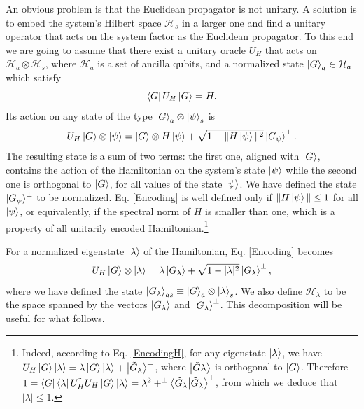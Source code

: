 \documentclass[a4paper,11pt]{article}
\begin{document}
An obvious problem is that the Euclidean propagator is not unitary. A solution is to embed the system's Hilbert space $\mathcal{H}_s$ in a larger one and find a unitary operator that acts on the system factor as the Euclidean propagator. To this end we are going to assume that there exist a unitary oracle $U_H$ that acts on $\mathcal{H}_a\otimes\mathcal{H}_s$, where $\mathcal{H}_a$ is a set of ancilla qubits, and a normalized state $\ket{G}_a\in\mathcal{H}_a$ which satisfy 
\begin{equation}
    \bra{G}U_H\ket{G}=H.
\label{EncodingH}
\end{equation}
Its action on any state of the type $\ket{G}_a\otimes \ket{\psi}_s$ is 
\begin{equation}
    U_H\ket{G}\otimes \ket{\psi}=\ket{G}\otimes H\ket{\psi}+\sqrt{1-\|H\ket{\psi}\|^2}\ket{G_\psi}^\perp.
    \label{Encoding}
\end{equation}
The resulting state is a sum of two terms: the first one, aligned with $\ket{G}$, contains the action of the Hamiltonian on the system's state $\ket{\psi}$ while the second one is orthogonal to $\ket{G}$, for all values of the state $\ket{\psi}$. We have defined the state $\ket{G_\psi}^\perp$ to be normalized. Eq. \eqref{Encoding} is well defined only if $\|H\ket{\psi}\|\leq 1$ for all $\ket{\psi}$, or equivalently, if the spectral norm of $H$ is smaller than one, which is a property of all unitarily encoded Hamiltonian.\footnote{Indeed, according to Eq. \eqref{EncodingH}, for any eigenstate $\ket{\lambda}$, we have $U_H\ket{G}\ket{\lambda} = \lambda \ket{G}\ket{\lambda} + \ket{\tilde{G}_\lambda}^\perp$, where $\ket{\tilde{G}\lambda}$ is orthogonal to $\ket{G}$. Therefore $1 = \bra{G}\bra{\lambda}U^\dagger_H U_H\ket{G}\ket{\lambda} = \lambda^2 +^\perp\braket{\tilde{G}_\lambda}^\perp$, from which we deduce that $|\lambda|\leq 1.$}

For a normalized eigenstate $\ket{\lambda}$ of the Hamiltonian, Eq. \eqref{Encoding} becomes 
\begin{equation}
    U_H\ket{G}\otimes \ket{\lambda}=\lambda\ket{G_\lambda}+\sqrt{1-|\lambda|^2}\ket{G_\lambda}^\perp,
    \label{EigenEncoding}
\end{equation}
where we have defined the state $\ket{G_\lambda}_{as}\equiv\ket{G}_a\otimes \ket{\lambda}_s$. We also define $\mathcal{H}_\lambda$ to be the space spanned by the vectors $\ket{G_\lambda}$ and $\ket{G_\lambda}^\perp$. This decomposition will be useful for what follows.
\end{document}
